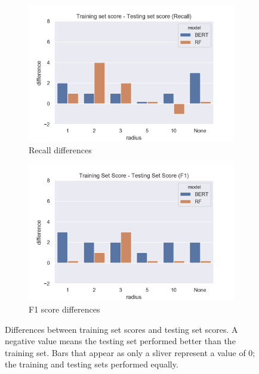 \documentclass[12pt, a4paper]{article}
\begin{document}
\begin{figure}[!h]
\begin{subfigure}[b]{0.48\textwidth}
        \includegraphics[width=\textwidth]{Recall_differences_barplot.png}
        \caption[]%
        {{\small Recall differences}}
        \label{fig:rec_dif}
    \end{subfigure}
    \quad
    \begin{subfigure}[b]{0.48\textwidth}   
        \centering 
        \includegraphics[width=\textwidth]{F1_differences_barplot.png}
        \caption[]%
        {{\small F1 score differences}}    
        \label{fig:f1_dif}
    \end{subfigure}
    \caption[]
    {\small Differences between training set scores and testing set scores. A negative value means the testing set performed better than the training set. Bars that appear as only a sliver represent a value of 0; the training and testing sets performed equally.} 
    \label{fig:scores}
\end{figure}
\end{document}
